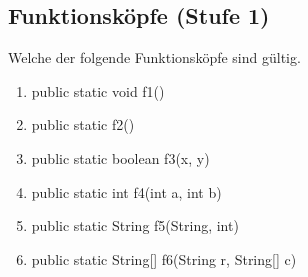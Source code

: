 \subsection{Funktionsköpfe (Stufe 1)}
Welche der folgende Funktionsköpfe sind gültig.
\begin{multicols}{2}
\begin{enumerate}\small
	\item public static void f1()
	\item public static f2()
	\item public static boolean f3(x, y)
	\item public static int f4(int a, int b)
	\item public static String f5(String, int)
	\item public static String[] f6(String r, String[] c)
\end{enumerate}
\end{multicols}